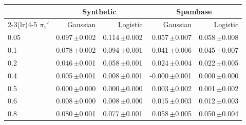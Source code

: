 \begin{tabular}{lrrrr}
\toprule
 & \multicolumn{2}{c}{Synthetic} & \multicolumn{2}{c}{Spambase} \\
\cmidrule(lr){2-3}\cmidrule(lr){4-5}
$\pi_1'$ & Gaussian & Logistic & Gaussian & Logistic \\
\midrule
0.05 & 0.097\,{\scriptsize$\pm$0.002} & 0.114\,{\scriptsize$\pm$0.002} & 0.057\,{\scriptsize$\pm$0.007} & 0.058\,{\scriptsize$\pm$0.008} \\
0.1 & 0.078\,{\scriptsize$\pm$0.002} & 0.094\,{\scriptsize$\pm$0.001} & 0.041\,{\scriptsize$\pm$0.006} & 0.045\,{\scriptsize$\pm$0.007} \\
0.2 & 0.046\,{\scriptsize$\pm$0.001} & 0.058\,{\scriptsize$\pm$0.001} & 0.024\,{\scriptsize$\pm$0.004} & 0.022\,{\scriptsize$\pm$0.005} \\
0.4 & 0.005\,{\scriptsize$\pm$0.001} & 0.008\,{\scriptsize$\pm$0.001} & -0.000\,{\scriptsize$\pm$0.001} & 0.000\,{\scriptsize$\pm$0.000} \\
0.5 & 0.000\,{\scriptsize$\pm$0.000} & 0.000\,{\scriptsize$\pm$0.000} & 0.003\,{\scriptsize$\pm$0.002} & 0.001\,{\scriptsize$\pm$0.002} \\
0.6 & 0.008\,{\scriptsize$\pm$0.000} & 0.008\,{\scriptsize$\pm$0.000} & 0.015\,{\scriptsize$\pm$0.003} & 0.012\,{\scriptsize$\pm$0.003} \\
0.8 & 0.080\,{\scriptsize$\pm$0.001} & 0.077\,{\scriptsize$\pm$0.001} & 0.058\,{\scriptsize$\pm$0.005} & 0.050\,{\scriptsize$\pm$0.004} \\
\bottomrule
\end{tabular}
